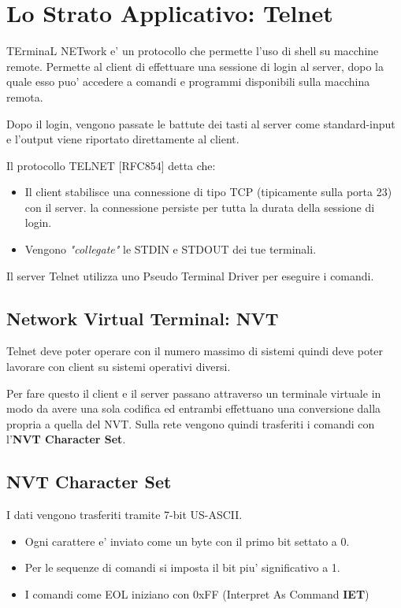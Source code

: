 \chapter{Lo Strato Applicativo: Telnet}
TErminaL NETwork e' un protocollo che permette l'uso di shell su macchine remote.
Permette al client di effettuare una sessione di login al server, dopo la quale esso puo' accedere a comandi e programmi disponibili sulla macchina remota.

Dopo il login, vengono passate le battute dei tasti al server come standard-input e l'output viene riportato direttamente al client.

Il protocollo TELNET [RFC854] detta che:
\begin{itemize}
    \item Il client stabilisce una connessione di tipo TCP (tipicamente sulla porta 23) con il server. la connessione persiste per tutta la durata della sessione di login.
    \item Vengono \textit{"collegate"} le STDIN e STDOUT dei tue terminali.
\end{itemize}
Il server Telnet utilizza uno Pseudo Terminal Driver per eseguire i comandi.
\section{Network Virtual Terminal: NVT}
Telnet deve poter operare con il numero massimo di sistemi quindi deve poter lavorare con client su sistemi operativi diversi.

Per fare questo il client e il server passano attraverso un terminale virtuale in modo da avere una sola codifica ed entrambi effettuano una conversione dalla propria a quella del NVT.
Sulla rete vengono quindi trasferiti i comandi con l'\textbf{NVT Character Set}.
\newpage
\section{NVT Character Set}
I dati vengono trasferiti tramite 7-bit US-ASCII.
\begin{itemize}
    \item Ogni carattere e' inviato come un byte con il primo bit settato a 0.
    \item Per le sequenze di comandi si imposta il bit piu' significativo a 1.
    \item I comandi come EOL iniziano con 0xFF (Interpret As Command \textbf{IET})
\end{itemize}
